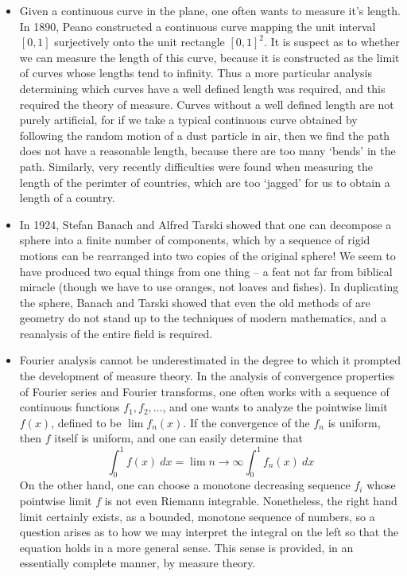 \begin{itemize}
  \item Given a continuous curve in the plane, one often wants to measure it's length. In 1890, Peano constructed a continuous curve mapping the unit interval $[0,1]$ surjectively onto the unit rectangle $[0,1]^2$. It is suspect as to whether we can measure the length of this curve, because it is constructed as the limit of curves whose lengths tend to infinity. Thus a more particular analysis determining which curves have a well defined length was required, and this required the theory of measure. Curves without a well defined length are not purely artificial, for if we take a typical continuous curve obtained by following the random motion of a dust particle in air, then we find the path does not have a reasonable length, because there are too many `bends' in the path. Similarly, very recently difficulties were found when measuring the length of the perimter of countries, which are too `jagged' for us to obtain a length of a country.

  \item In 1924, Stefan Banach and Alfred Tarski showed that one can decompose a sphere into a finite number of components, which by a sequence of rigid motions can be rearranged into two copies of the original sphere! We seem to have produced two equal things from one thing -- a feat not far from biblical miracle (though we have to use oranges, not loaves and fishes). In duplicating the sphere, Banach and Tarski showed that even the old methods of are geometry do not stand up to the techniques of modern mathematics, and a reanalysis of the entire field is required.

  \item Fourier analysis cannot be underestimated in the degree to which it prompted the development of measure theory. In the analysis of convergence properties of Fourier series and Fourier transforms, one often works with a sequence of continuous functions $f_1, f_2, \dots$, and one wants to analyze the pointwise limit $f(x)$, defined to be $\lim f_n(x)$. If the convergence of the $f_n$ is uniform, then $f$ itself is uniform, and one can easily determine that
  \[ \int_0^1 f(x)\ dx = \lim{n \to \infty} \int_0^1 f_n(x)\ dx \]
  On the other hand, one can choose a monotone decreasing sequence $f_i$ whose pointwise limit $f$ is not even Riemann integrable. Nonetheless, the right hand limit certainly exists, as a bounded, monotone sequence of numbers, so a question arises as to how we may interpret the integral on the left so that the equation holds in a more general sense. This sense is provided, in an essentially complete manner, by measure theory.
\end{itemize}
